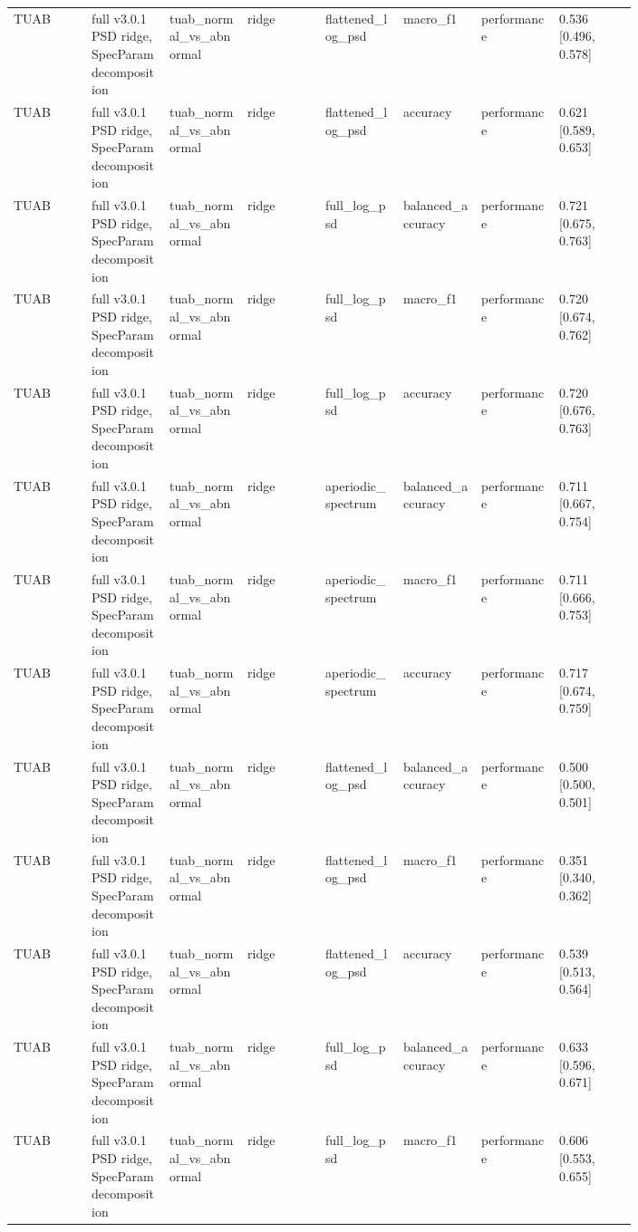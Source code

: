 \begin{longtable}{p{0.10\linewidth}p{0.10\linewidth}p{0.10\linewidth}p{0.10\linewidth}p{0.10\linewidth}p{0.10\linewidth}p{0.10\linewidth}p{0.10\linewidth}}
TUAB & full v3.0.1 PSD ridge, SpecParam decomposition & tuab\_normal\_vs\_abnormal & ridge & flattened\_log\_psd & macro\_f1 & performance & 0.536 [0.496, 0.578]\\
TUAB & full v3.0.1 PSD ridge, SpecParam decomposition & tuab\_normal\_vs\_abnormal & ridge & flattened\_log\_psd & accuracy & performance & 0.621 [0.589, 0.653]\\
TUAB & full v3.0.1 PSD ridge, SpecParam decomposition & tuab\_normal\_vs\_abnormal & ridge & full\_log\_psd & balanced\_accuracy & performance & 0.721 [0.675, 0.763]\\
TUAB & full v3.0.1 PSD ridge, SpecParam decomposition & tuab\_normal\_vs\_abnormal & ridge & full\_log\_psd & macro\_f1 & performance & 0.720 [0.674, 0.762]\\
TUAB & full v3.0.1 PSD ridge, SpecParam decomposition & tuab\_normal\_vs\_abnormal & ridge & full\_log\_psd & accuracy & performance & 0.720 [0.676, 0.763]\\
TUAB & full v3.0.1 PSD ridge, SpecParam decomposition & tuab\_normal\_vs\_abnormal & ridge & aperiodic\_spectrum & balanced\_accuracy & performance & 0.711 [0.667, 0.754]\\
TUAB & full v3.0.1 PSD ridge, SpecParam decomposition & tuab\_normal\_vs\_abnormal & ridge & aperiodic\_spectrum & macro\_f1 & performance & 0.711 [0.666, 0.753]\\
TUAB & full v3.0.1 PSD ridge, SpecParam decomposition & tuab\_normal\_vs\_abnormal & ridge & aperiodic\_spectrum & accuracy & performance & 0.717 [0.674, 0.759]\\
TUAB & full v3.0.1 PSD ridge, SpecParam decomposition & tuab\_normal\_vs\_abnormal & ridge & flattened\_log\_psd & balanced\_accuracy & performance & 0.500 [0.500, 0.501]\\
TUAB & full v3.0.1 PSD ridge, SpecParam decomposition & tuab\_normal\_vs\_abnormal & ridge & flattened\_log\_psd & macro\_f1 & performance & 0.351 [0.340, 0.362]\\
TUAB & full v3.0.1 PSD ridge, SpecParam decomposition & tuab\_normal\_vs\_abnormal & ridge & flattened\_log\_psd & accuracy & performance & 0.539 [0.513, 0.564]\\
TUAB & full v3.0.1 PSD ridge, SpecParam decomposition & tuab\_normal\_vs\_abnormal & ridge & full\_log\_psd & balanced\_accuracy & performance & 0.633 [0.596, 0.671]\\
TUAB & full v3.0.1 PSD ridge, SpecParam decomposition & tuab\_normal\_vs\_abnormal & ridge & full\_log\_psd & macro\_f1 & performance & 0.606 [0.553, 0.655]\\

\end{longtable}
